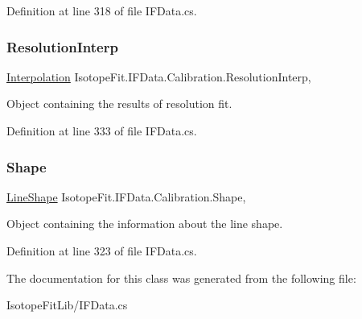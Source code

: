 Definition at line 318 of file I\+F\+Data.\+cs.

\mbox{\label{class_isotope_fit_1_1_i_f_data_1_1_calibration_ab8db2fa10ee3de8f8deca251f4bd3518}} 
\subsubsection{\texorpdfstring{Resolution\+Interp}{ResolutionInterp}}
{\footnotesize\ttfamily \mbox{\hyperlink{class_isotope_fit_1_1_interpolation}{Interpolation}} Isotope\+Fit.\+I\+F\+Data.\+Calibration.\+Resolution\+Interp\hspace{0.3cm}{\ttfamily [get]}, {\ttfamily [set]}}



Object containing the results of resolution fit. 



Definition at line 333 of file I\+F\+Data.\+cs.

\mbox{\label{class_isotope_fit_1_1_i_f_data_1_1_calibration_ad0c3e0969448ad0cc57307c77c2222eb}} 
\subsubsection{\texorpdfstring{Shape}{Shape}}
{\footnotesize\ttfamily \mbox{\hyperlink{class_isotope_fit_1_1_i_f_data_1_1_calibration_1_1_line_shape}{Line\+Shape}} Isotope\+Fit.\+I\+F\+Data.\+Calibration.\+Shape\hspace{0.3cm}{\ttfamily [get]}, {\ttfamily [set]}}



Object containing the information about the line shape. 



Definition at line 323 of file I\+F\+Data.\+cs.



The documentation for this class was generated from the following file\+:\begin{DoxyCompactItemize}
\item 
Isotope\+Fit\+Lib/I\+F\+Data.\+cs\end{DoxyCompactItemize}
